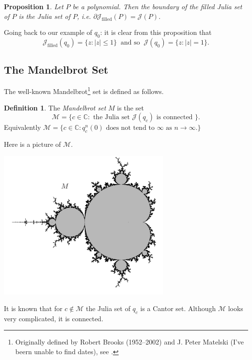 \documentclass[12pt]{article}
\newtheorem{proposition}[theorem]{Proposition}
\theoremstyle{definition}
\newtheorem{definition}[theorem]{Definition}
\theoremstyle{remark}
\begin{document}
\begin{proposition}
Let $P$ be a polynomial.
Then the boundary of the filled Julia set of $P$ is the Julia set of $P$, i.e. 
$\partial \mathcal{J}_{\mathrm{filled}}(P) = \mathcal{J}(P)$.
\end{proposition}

Going back to our example of $q_0$: it is clear from this proposition that
\[
\mathcal{J}_{\mathrm{filled}}(q_0) = \{ z : |z| \le 1\} \ \text{ and so } \ \mathcal{J}(q_0) = \{z : |z| =1 \}.
\]


\subsection{The Mandelbrot Set}
The well-known Mandelbrot\footnote{Originally defined by Robert Brooks (1952--2002)
and J. Peter Matelski (I've beern unable to find dates), see \cite{BM78}.} set is defined as follows.

\begin{definition}
The \emph{Mandelbrot set} $M$ is the set
\[
\mathcal M = \{ c\in \mathbb{C} : \text{ the Julia set $\mathcal{J}(q_c)$ is connected }\}.
\]
Equivalently $\mathcal M = \{ c \in \mathbb{C} : q_c^n(0) \text{ does not tend to $\infty$ as $n\to\infty$}.\}$
\end{definition}
Here is a picture of $\mathcal M$.

\vspace{4mm}
{\centering
\includegraphics[width=0.65\textwidth]{mandelbrot}
\par}
\vspace{4mm}

It is known that for $c \notin \mathcal M$ the Julia set of $q_c$ is a Cantor set. Although $\mathcal M$ looks very complicated, it is connected.
\end{document}
